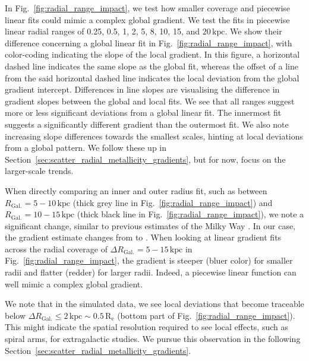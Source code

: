 \documentclass[fleqn,usenatbib]{mnras}
\begin{document}
In Fig.~\ref{fig:radial_range_impact}, we test how smaller coverage and piecewise linear fits could mimic a complex global gradient. We test the fits in piecewise linear radial ranges of 0.25, 0.5, 1, 2, 5, 8, 10, 15, and $20\,\mathrm{kpc}$. We show their difference concerning a global linear fit in Fig.~\ref{fig:radial_range_impact}, with color-coding indicating the slope of the local gradient. In this figure, a horizontal dashed line indicates the same slope as the global fit, whereas the offset of a line from the said horizontal dashed line indicates the local deviation from the global gradient intercept. Differences in line slopes are visualising the difference in gradient slopes between the global and local fits. We see that all ranges suggest more or less significant deviations from a global linear fit. The innermost fit suggests a significantly different gradient than the outermost fit. We also note increasing slope differences towards the smallest scales, hinting at local deviations from a global pattern. We follow these up in Section~\ref{sec:scatter_radial_metallicity_gradients}, but for now, focus on the larger-scale trends.

When directly comparing an inner and outer radius fit, such as between $R_\mathrm{Gal.} = 5-10\,\mathrm{kpc}$ (thick grey line in Fig.~\ref{fig:radial_range_impact}) and $R_\mathrm{Gal.} = 10-15\,\mathrm{kpc}$ (thick black line in Fig.~\ref{fig:radial_range_impact}), we note a significant change, similar to previous estimates of the Milky Way \citep[e.g.][]{Yong2012, Lemasle2008}. In our case, the gradient estimate changes from  to . When looking at linear gradient fits across the radial coverage of $\Delta R_\mathrm{Gal.} = 5-15\,\mathrm{kpc}$ in Fig.~\ref{fig:radial_range_impact}, the gradient is steeper (bluer color) for smaller radii and flatter (redder) for larger radii. Indeed, a piecewise linear function can well mimic a complex global gradient.

We note that in the simulated data, we see local deviations that become traceable below $\Delta R_\mathrm{Gal.} \leq 2\,\mathrm{kpc} \sim 0.5\,\mathrm{R_e}$ (bottom part of Fig.~\ref{fig:radial_range_impact}). This might indicate the spatial resolution required to see local effects, such as spiral arms, for extragalactic studies. We pursue this observation in the following Section~\ref{sec:scatter_radial_metallicity_gradients}.
\end{document}
